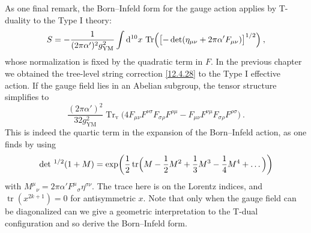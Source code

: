 As one final remark, the Born--Infeld form for the gauge action applies by T-duality to the Type I theory:
\begin{equation}
	S = -\frac{1}{(2\pi\alpha')^2 g_{\mathrm{YM}}^2}\int \mathrm{d}^{10}x\,\operatorname{Tr}\Bigl(\bigl[-\det(\eta_{\mu\nu} + 2\pi\alpha' F_{\mu\nu})\bigr]^{1/2}\Bigr) \:, \label{13.3.32}
\end{equation}
whose normalization is fixed by the quadratic term in $F$. In the previous chapter we obtained the tree-level string correction \eqref{12.4.28} to the Type I effective action. If the gauge field lies in an Abelian subgroup, the tensor structure simplifies to
\begin{equation}
	\frac{(2\pi\alpha')^2}{32g_{\mathrm{YM}}^2}\operatorname{Tr}_{\mathrm{v}}\bigl(4F_{\mu\nu}F^{\nu\sigma}F_{\sigma\rho}F^{\rho\mu} - F_{\mu\nu}F^{\nu\mu}F_{\sigma\rho}F^{\rho\sigma}\bigr) \:. \label{13.3.33}
\end{equation}
This is indeed the quartic term in the expansion of the Born--Infeld action, as one finds by using
\begin{equation}
	\det\,^{1/2}(1 + M) = \exp\biggl(\frac{1}{2}\operatorname{tr}\Bigl(M - \frac{1}{2}M^2 + \frac{1}{3}M^3 - \frac{1}{4}M^4 + \dots\Bigr)\biggr) \label{13.3.34}
\end{equation}
with $M^\mu{}_\nu = 2\pi\alpha' F^\mu{}_\sigma \eta^{\sigma\nu}$. The trace here is on the Lorentz indices, and $\operatorname{tr}(x^{2k+1}) = 0$ for antisymmetric $x$. Note that only when the gauge field can be diagonalized can we give a geometric interpretation to the T-dual configuration and so derive the Born--Infeld form.
